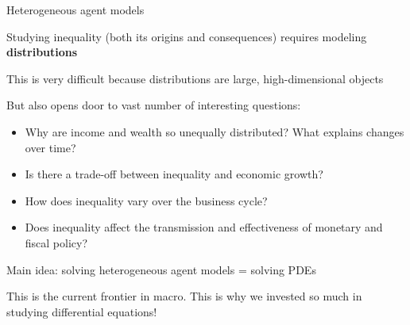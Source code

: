 \documentclass[11pt, aspectratio=169]{beamer}
\newenvironment{witemize}{\itemize\addtolength{\itemsep}{10pt}}{\enditemize}
\begin{document}
\begin{frame}{Heterogeneous agent models}

\begin{witemize}
\item Studying inequality (both its origins and consequences) requires modeling \textbf{distributions}

\item This is very difficult because distributions are large, high-dimensional objects

\item But also opens door to vast number of interesting questions:
\begin{itemize}
\item Why are income and wealth so unequally distributed? What explains changes over time?
\item Is there a trade-off between inequality and economic growth?
\item How does inequality vary over the business cycle?
\item Does inequality affect the transmission and effectiveness of monetary and fiscal policy?
\end{itemize}

\item Main idea: solving heterogeneous agent models = solving PDEs

	{\footnotesize This is the current frontier in macro. This is why we invested so much in studying differential equations!}
\end{witemize}
\end{frame}
\end{document}
